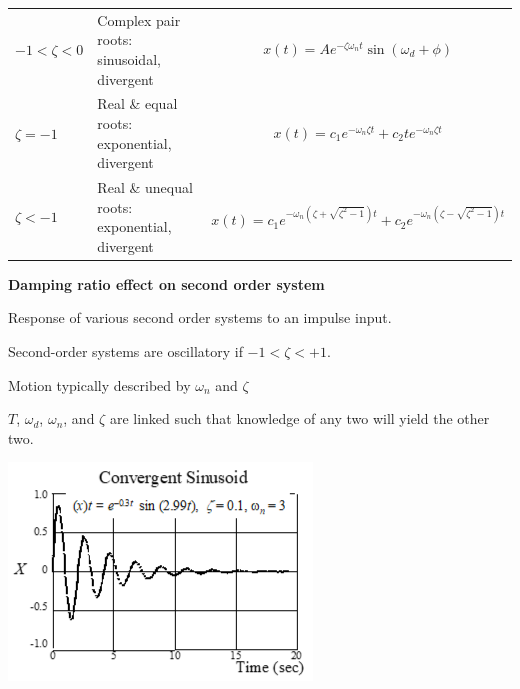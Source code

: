 \documentclass[
]{book}
\begin{document}
\begin{longtable}[]{@{}lll@{}}
\begin{minipage}[t]{0.13\columnwidth}\raggedright
\(-1 < \zeta < 0\)\strut
\end{minipage} & \begin{minipage}[t]{0.39\columnwidth}\raggedright
Complex pair roots: sinusoidal, divergent\strut
\end{minipage} & \begin{minipage}[t]{0.39\columnwidth}\raggedright
\[ x\left(t\right) =  A e^{-\zeta \omega_n t} \sin \left( \omega_d + \phi \right) \]\strut
\end{minipage}\tabularnewline
\begin{minipage}[t]{0.13\columnwidth}\raggedright
\(\zeta = -1\)\strut
\end{minipage} & \begin{minipage}[t]{0.39\columnwidth}\raggedright
Real \& equal roots: exponential, divergent\strut
\end{minipage} & \begin{minipage}[t]{0.39\columnwidth}\raggedright
\[ x\left(t\right) = c_1 e^{-\omega_n \zeta t} + c_2 t e^{-\omega_n \zeta t} \]\strut
\end{minipage}\tabularnewline
\begin{minipage}[t]{0.13\columnwidth}\raggedright
\(\zeta < -1\)\strut
\end{minipage} & \begin{minipage}[t]{0.39\columnwidth}\raggedright
Real \& unequal roots: exponential, divergent\strut
\end{minipage} & \begin{minipage}[t]{0.39\columnwidth}\raggedright
\[ x\left(t\right) = c_1 e^{-\omega_n \left( \zeta + \sqrt{\zeta^2 - 1} \right)t} + c_2 e^{-\omega_n \left( \zeta - \sqrt{\zeta^2 - 1} \right)t} \]\strut
\end{minipage}\tabularnewline
\bottomrule
\end{longtable}

\textbf{Damping ratio effect on second order system}

Response of various second order systems to an impulse input.

Second-order systems are oscillatory if \(-1 < \zeta < +1\).

Motion typically described by \(\omega_n\) and \(\zeta\)

\(T\), \(\omega_d\), \(\omega_n\), and \(\zeta\) are linked such that knowledge of any two will yield the other two.

\includegraphics{media/08/image50.png}
\end{document}
